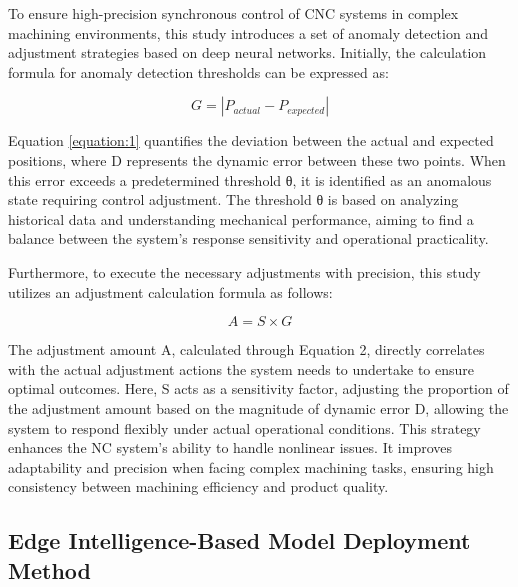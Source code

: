 \documentclass[preprint,12pt]{elsarticle}
\begin{document}
To ensure high-precision synchronous control of CNC systems in complex machining environments, this study introduces a set of anomaly detection and adjustment strategies based on deep neural networks. Initially, the calculation formula for anomaly detection thresholds can be expressed as:

\begin{equation}
    G=|P_{actual}-P_{expected}|
    \label{equation:1}
\end{equation}

Equation \ref{equation:1} quantifies the deviation between the actual and expected positions, where D represents the dynamic error between these two points. When this error exceeds a predetermined threshold θ, it is identified as an anomalous state requiring control adjustment. The threshold θ is based on analyzing historical data and understanding mechanical performance, aiming to find a balance between the system's response sensitivity and operational practicality.

Furthermore, to execute the necessary adjustments with precision, this study utilizes an adjustment calculation formula as follows:

\begin{equation}
    A=S \times G
\end{equation}

The adjustment amount A, calculated through Equation 2, directly correlates with the actual adjustment actions the system needs to undertake to ensure optimal outcomes. Here, S acts as a sensitivity factor, adjusting the proportion of the adjustment amount based on the magnitude of dynamic error D, allowing the system to respond flexibly under actual operational conditions. This strategy enhances the NC system's ability to handle nonlinear issues. It improves adaptability and precision when facing complex machining tasks, ensuring high consistency between machining efficiency and product quality.

\subsection{Edge Intelligence-Based Model Deployment Method}
\end{document}
